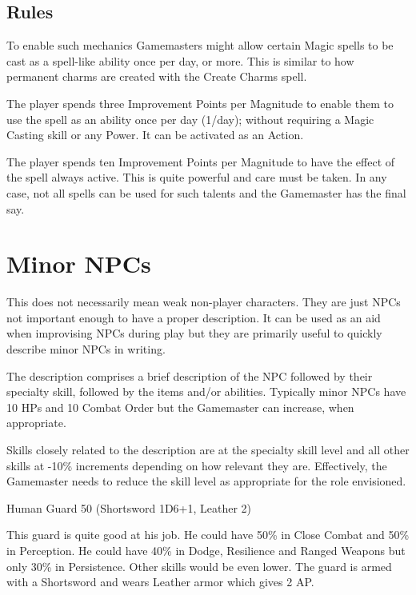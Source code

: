 \subsection{Rules}
To enable such mechanics Gamemasters might allow certain Magic spells to be cast as a spell-like ability once per day, or more. This is similar to how permanent charms are created with the Create Charms spell.

The player spends three Improvement Points per Magnitude to enable them to use the spell as an ability once per day (1/day); without requiring a Magic Casting skill or any Power. It can be activated as an Action. 

The player spends ten Improvement Points per Magnitude to have the effect of the spell always active. This is quite powerful and care must be taken. In any case, not all spells can be used for such talents and the Gamemaster has the final say.


\section{Minor NPCs}
This does not necessarily mean weak non-player characters. They are just NPCs not important enough to have a proper description. It can be used as an aid when improvising NPCs during play but they are primarily useful to quickly describe minor NPCs in writing.

The description comprises a brief description of the NPC followed by their specialty skill, followed by the items and/or abilities. Typically minor NPCs have 10 HPs and 10 Combat Order but the Gamemaster can increase, when appropriate.

Skills closely related to the description are at the specialty skill level and all other skills at -10\% increments depending on how relevant they are. Effectively, the Gamemaster needs to reduce the skill level as appropriate for the role envisioned.

\vspace{1em}
\begin{rpg-examplebox}	
Human Guard 50 (Shortsword 1D6+1, Leather 2)
\end{rpg-examplebox}

This guard is quite good at his job. He could have 50\% in Close Combat and 50\% in Perception. He could have 40\% in Dodge, Resilience and Ranged Weapons but only 30\% in Persistence. Other skills would be even lower.
The guard is armed with a Shortsword and wears Leather armor which gives 2 AP.

